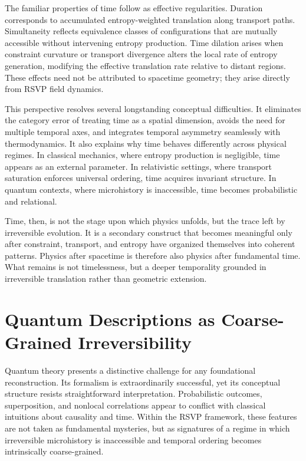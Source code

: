 \documentclass[11pt]{article}
\begin{document}
The familiar properties of time follow as effective regularities. Duration corresponds to accumulated entropy-weighted translation along transport paths. Simultaneity reflects equivalence classes of configurations that are mutually accessible without intervening entropy production. Time dilation arises when constraint curvature or transport divergence alters the local rate of entropy generation, modifying the effective translation rate relative to distant regions. These effects need not be attributed to spacetime geometry; they arise directly from RSVP field dynamics.

This perspective resolves several longstanding conceptual difficulties. It eliminates the category error of treating time as a spatial dimension, avoids the need for multiple temporal axes, and integrates temporal asymmetry seamlessly with thermodynamics. It also explains why time behaves differently across physical regimes. In classical mechanics, where entropy production is negligible, time appears as an external parameter. In relativistic settings, where transport saturation enforces universal ordering, time acquires invariant structure. In quantum contexts, where microhistory is inaccessible, time becomes probabilistic and relational.

Time, then, is not the stage upon which physics unfolds, but the trace left by irreversible evolution. It is a secondary construct that becomes meaningful only after constraint, transport, and entropy have organized themselves into coherent patterns. Physics after spacetime is therefore also physics after fundamental time. What remains is not timelessness, but a deeper temporality grounded in irreversible translation rather than geometric extension.

\section{Quantum Descriptions as Coarse-Grained Irreversibility}

Quantum theory presents a distinctive challenge for any foundational reconstruction. Its formalism is extraordinarily successful, yet its conceptual structure resists straightforward interpretation. Probabilistic outcomes, superposition, and nonlocal correlations appear to conflict with classical intuitions about causality and time. Within the RSVP framework, these features are not taken as fundamental mysteries, but as signatures of a regime in which irreversible microhistory is inaccessible and temporal ordering becomes intrinsically coarse-grained.
\end{document}
